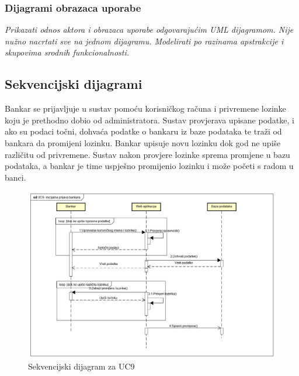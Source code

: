 					
				\subsubsection{Dijagrami obrazaca uporabe}
					
					\textit{Prikazati odnos aktora i obrazaca uporabe odgovarajućim UML dijagramom. Nije nužno nacrtati sve na jednom dijagramu. Modelirati po razinama apstrakcije i skupovima srodnih funkcionalnosti.}
				\eject		
				
			\subsection{Sekvencijski dijagrami}
				
				
				Bankar se prijavljuje u sustav pomoću korisničkog računa i privremene lozinke koju je prethodno dobio od administratora. Sustav provjerava upisane podatke, i ako su podaci točni, dohvaća podatke o bankaru iz baze podataka te traži od bankara da promijeni lozinku. Bankar upisuje novu lozinku dok god ne upiše različitu od privremene. Sustav nakon provjere lozinke sprema promjene u bazu podataka, a bankar je time uspješno promijenio lozinku i može početi s radom u banci.
				\eject
				
				\begin{figure}[H]
					\includegraphics[scale=0.55]{slike/UC9- inicijalna prijava bankara1.PNG}
					\centering
					\caption{Sekvencijski dijagram za UC9}
					\label{fig:uc9}
				\end{figure}
			\eject
			
			
